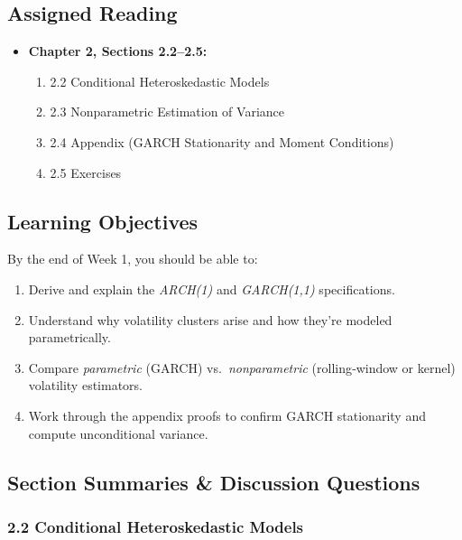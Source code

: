 \documentclass[11pt]{amsart}
\begin{document}
\subsection{Assigned Reading}
\begin{itemize}[noitemsep,left=0pt]
  \item \textbf{Chapter 2, Sections 2.2–2.5:}
    \begin{enumerate}[noitemsep,left=1em]
      \item 2.2 Conditional Heteroskedastic Models
      \item 2.3 Nonparametric Estimation of Variance
      \item 2.4 Appendix (GARCH Stationarity and Moment Conditions)
      \item 2.5 Exercises
    \end{enumerate}
\end{itemize}

\subsection{Learning Objectives}
By the end of Week 1, you should be able to:
\begin{enumerate}[noitemsep,left=0pt]
  \item Derive and explain the \emph{ARCH(1)} and \emph{GARCH(1,1)} specifications.
  \item Understand why volatility clusters arise and how they're modeled parametrically.
  \item Compare \emph{parametric} (GARCH) vs.\ \emph{nonparametric} (rolling‐window or kernel) volatility estimators.
  \item Work through the appendix proofs to confirm GARCH stationarity and compute unconditional variance.
\end{enumerate}

\subsection{Section Summaries \& Discussion Questions}

\subsubsection{2.2 Conditional Heteroskedastic Models}
\end{document}
